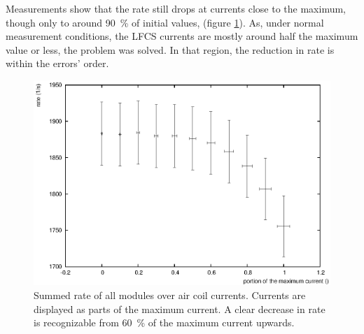   Measurements show that the rate still drops at currents close to the maximum, though only to around \SI{90}{\percent} of initial values, (figure \ref{fig:aircoilCountsCurrent}). As, under normal measurement conditions, the LFCS currents are mostly around half the maximum value or less, the problem was solved. In that region,  the reduction in rate is within the errors' order.
  \begin{figure}

  \centering
  	\includegraphics[width = 0.9 \textwidth]{graphics/aircoilCounts/aircoilsCountsCurrent.eps}
  	\caption[Rate dependence on magnetic fields]{Summed rate of all modules over air coil currents. Currents are displayed as parts of the maximum current. A clear decrease in rate is recognizable from \SI{60}{\percent} of the maximum current upwards.}
  	\label{fig:aircoilCountsCurrent}
  \end{figure}
  


